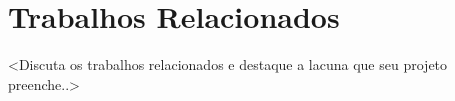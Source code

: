 \section{Trabalhos Relacionados}
\label{sec:relacionados}


<Discuta os trabalhos relacionados e destaque a lacuna que seu projeto preenche..>
